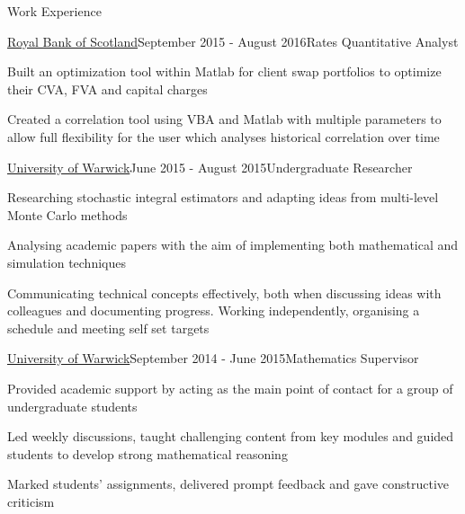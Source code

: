 \documentclass{resume} %
\begin{document}
\begin{rSection}{Work Experience}
\begin{rSubsection}{\href{https://www.natwestmarkets.com/}{Royal Bank of Scotland}}{September 2015 - August 2016}{Rates Quantitative Analyst}{}
	\item Built an optimization tool within Matlab for client swap portfolios to optimize their CVA, FVA and capital charges 
	\item Created a correlation tool using VBA and Matlab with multiple parameters to allow full flexibility for the user which analyses historical correlation over time

\end{rSubsection}

\iffalse
\begin{rSubsection}{\href{https://warwick.ac.uk/fac/sci/maths/}{University of Warwick}}{June 2015 - August 2015}{Undergraduate Researcher}{}
\item Researching stochastic integral estimators and adapting ideas from multi-level Monte Carlo methods
\item Analysing academic papers with the aim of implementing both mathematical and simulation techniques 
\item Communicating technical concepts effectively, both when discussing ideas with colleagues and documenting progress. Working independently, organising a schedule and meeting self set targets
	
\end{rSubsection}

\begin{rSubsection}{\href{https://warwick.ac.uk/fac/sci/maths/}{University of Warwick}}{September 2014 - June 2015}{Mathematics Supervisor}{}
\item Provided academic support by acting as the main point of contact for a group of undergraduate students
\item Led weekly discussions, taught challenging content from key modules and guided students to develop strong mathematical reasoning
\item Marked students' assignments, delivered prompt feedback and gave constructive criticism

\end{rSubsection}


\end{rSection}
\end{document}
